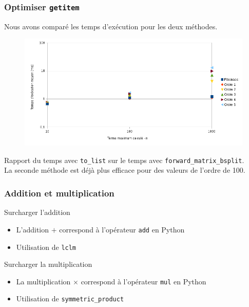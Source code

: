 \documentclass{beamer}
\newlength{\charwidth}
\newcommand{\uline}{\underline{\hspace{2\charwidth}}}
\begin{document}

\begin{frame}
\frametitle{Optimiser \texttt{\uline getitem \uline}}
\begin{center}
Nous avons comparé les temps d'exécution pour les deux méthodes.
\begin{figure}
    \includegraphics[scale=0.4]{graphe}
\end{figure}
{\scriptsize Rapport du temps avec \texttt{to\_list} sur le temps avec 
\texttt{forward\_matrix\_bsplit}.}\\
\vspace{1cm}
La seconde méthode est déjà plus efficace pour des valeurs de l'ordre de 100.
\end{center}
\end{frame}


\begin{frame}
\frametitle{Addition et multiplication}
\begin{center}
\begin{block}{Surcharger l'addition}
    \begin{itemize}
        \item L'addition $+$ correspond à l'opérateur \texttt{\uline add\uline} en Python
        \item Utilisation de \texttt{lclm}
    \end{itemize}
\end{block}
\vspace{1cm}
\begin{block}{Surcharger la multiplication}
    \begin{itemize}
        \item La multiplication $\times$ correspond à l'opérateur \texttt{\uline mul\uline} en
            Python
        \item Utilisation de \texttt{symmetric\_product}
    \end{itemize}
\end{block}
\end{center}
\end{frame}
\end{document}
